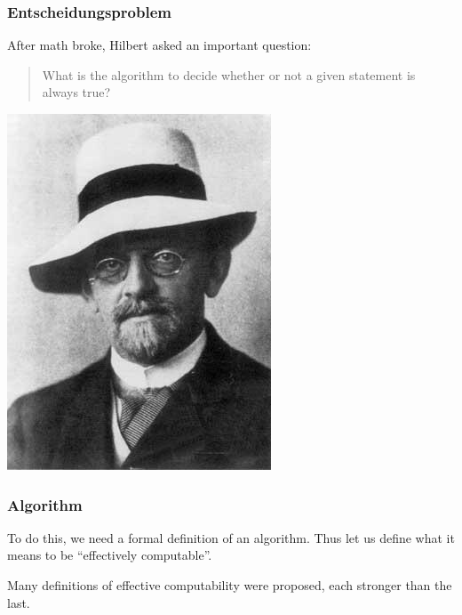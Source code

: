 \documentclass[mathserif]{beamer}
\begin{document}
\begin{frame}
  \frametitle{Entscheidungsproblem}

  \begin{multicols}{2}
    After math broke, Hilbert asked an important question:

    \begin{quote}
      What is the algorithm to decide whether or not a given statement is always
      true?
    \end{quote}

    \includegraphics[width=\linewidth]{media/hilbert.jpg}
  \end{multicols}
\end{frame}

\begin{frame}
  \frametitle{Algorithm}
  To do this, we need a formal definition of an algorithm. Thus let
  us define what it means to be ``effectively computable''.

  Many definitions of effective computability were proposed, each stronger than
  the last.
\end{frame}
\end{document}
